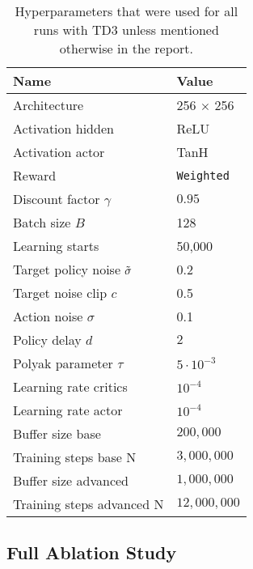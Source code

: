 \documentclass[11pt]{article}
\begin{document}
\begin{table}[h]
    \centering
    \caption{Hyperparameters that were used for all runs with TD3 unless mentioned otherwise in the report.}
    \label{tab:td3_params}
    \begin{tabular}{|l|l|}
    \hline
         \textbf{Name} & \textbf{Value} \\ \hline
         Architecture & 256 $\times$ 256 \\
         Activation hidden & ReLU \\
         Activation actor & TanH \\
         Reward & \texttt{Weighted} \\
         Discount factor $\gamma$ & $0.95$ \\
         Batch size $B$ & 128 \\
         Learning starts & 50,000 \\
         Target policy noise $\Tilde{\sigma}$ & 0.2 \\
         Target noise clip $c$ & 0.5 \\
         Action noise $\sigma$ & 0.1 \\
         Policy delay $d$ & $2$ \\
         Polyak parameter $\tau$ & $5 \cdot 10^{-3}$ \\
         Learning rate critics & $10^{-4}$ \\
         Learning rate actor & $10^{-4}$ \\
         Buffer size base & $200,000$ \\
         Training steps base N & $3,000,000$ \\
         Buffer size advanced & $1,000,000$ \\
         Training steps advanced N & $12,000,000$ \\
    \hline
    \end{tabular}
\end{table}

\subsection{Full Ablation Study}
\end{document}
